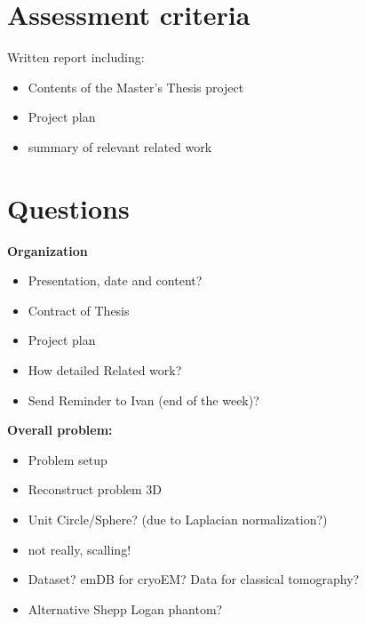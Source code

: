 \chapter{Assessment criteria}
Written report including: 
\begin{itemize}
    \item Contents of the Master's Thesis project
    \item Project plan
    \item summary of relevant related work
\end{itemize}

\chapter{Questions}


\textbf{Organization}
\begin{itemize}
    \item Presentation, date and content?
    \item Contract of Thesis
    \item Project plan
    \item How detailed Related work?
    \item Send Reminder to Ivan (end of the week)?
\end{itemize}

\textbf{Overall problem:}
\begin{itemize}
    \item Problem setup
    \item Reconstruct problem 3D
    \item Unit Circle/Sphere? (due to Laplacian normalization?)
    \item not really, scalling! 
    \item Dataset? emDB for cryoEM? Data for classical tomography?
    \item Alternative Shepp Logan phantom?
\end{itemize}
